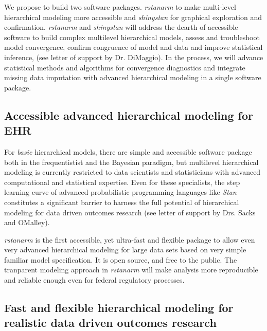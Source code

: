 \documentclass[11pt,notitlepage]{article}
\begin{document}
We propose to build two software packages. \textit{rstanarm} to make multi-level hierarchical modeling more accessible and \textit{shinystan} for graphical exploration and confirmation. \textit{rstanarm} and \textit{shinystan} will address the dearth of accessible software to build complex multilevel hierarchical models, assess and troubleshoot model convergence, confirm congruence of model and data and improve statistical inference, (see letter of support by Dr. DiMaggio). In the process, we will advance statistical methods and algorithms for convergence diagnostics and integrate missing data imputation with advanced hierarchical modeling in a single software package.  

\subsection*{Accessible advanced hierarchical modeling for EHR}

For \textit{basic} hierarchical models, there are simple and accessible software package both in the frequentistist and the Bayesian paradigm, but multilevel hierarchical modeling is currently restricted to data scientists and statisticians with advanced computational and statistical expertise. Even for these specialists, the step learning curve of advanced probabilistic programming languages like \textit{Stan} constitutes a significant barrier to harness the full potential of hierarchical modeling for data driven outcomes research (see letter of support by Drs. Sacks and OMalley).

\textit{rstanarm} is the first accessible, yet ultra-fast and flexible package to allow even very advanced hierarchical modeling for large data sets based on very simple familiar model specification. It is open source, and free to the public. The tranparent modeling approach in \textit{rstanarm} will make analysis more reproducible and reliable enough even for federal regulatory processes. 

\subsection*{Fast and flexible hierarchical modeling for realistic data driven outcomes research }
\end{document}
